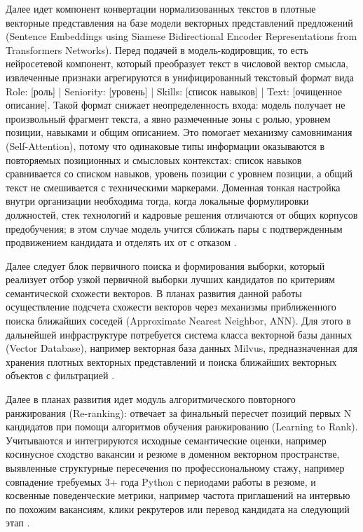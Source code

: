 \begin{compactenum}
  \item Далее идет компонент конвертации нормализованных текстов в плотные векторные представления на базе модели векторных представлений предложений (Sentence Embeddings using Siamese Bidirectional Encoder Representations from Transformers Networks). Перед подачей в модель-кодировщик, то есть нейросетевой компонент, который преобразует текст в числовой вектор смысла, извлеченные признаки агрегируются в унифицированный текстовый формат вида Role: [роль] | Seniority: [уровень] | Skills: [список навыков] | Text: [очищенное описание]. Такой формат снижает неопределенность входа: модель получает не произвольный фрагмент текста, а явно размеченные зоны с ролью, уровнем позиции, навыками и общим описанием. Это помогает механизму самовнимания (Self-Attention), потому что одинаковые типы информации оказываются в повторяемых позиционных и смысловых контекстах: список навыков сравнивается со списком навыков, уровень позиции с уровнем позиции, а общий текст не смешивается с техническими маркерами. Доменная тонкая настройка внутри организации необходима тогда, когда локальные формулировки должностей, стек технологий и кадровые решения отличаются от общих корпусов предобучения; в этом случае модель учится сближать пары с подтвержденным продвижением кандидата и отделять их от с отказом \cite{src01, src06, src24}.
  \item Далее следует блок первичного поиска и формирования выборки, который реализует отбор узкой первичной выборки лучших кандидатов по критериям семантической схожести векторов. В планах развития данной работы осуществление подсчета схожести векторов через механизмы приближенного поиска ближайших соседей (Approximate Nearest Neighbor, ANN). Для этого в дальнейшей инфраструктуре потребуется система класса векторной базы данных (Vector Database), например векторная база данных Milvus, предназначенная для хранения плотных векторных представлений и поиска ближайших векторных объектов с фильтрацией \cite{src12}.
  \item Далее в планах развития идет модуль алгоритмического повторного ранжирования (Re-ranking): отвечает за финальный пересчет позиций первых N кандидатов при помощи алгоритмов обучения ранжированию (Learning to Rank). Учитываются и интегрируются исходные семантические оценки, например косинусное сходство вакансии и резюме в доменном векторном пространстве, выявленные структурные пересечения по профессиональному стажу, например совпадение требуемых 3+ года Python с периодами работы в резюме, и косвенные поведенческие метрики, например частота приглашений на интервью по похожим вакансиям, клики рекрутеров или перевод кандидата на следующий этап \cite{src17, src38, src43, src44, src45}.

\end{compactenum}
